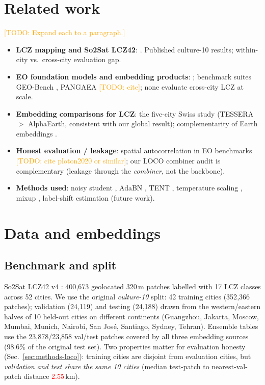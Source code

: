 \documentclass[11pt]{article}
\newif\ifverified
\newcommand{\uv}[1]{\ifverified#1\else\textcolor{red}{#1}\fi}
\newcommand{\todo}[1]{\textcolor{orange}{[TODO: #1]}}
\begin{document}
\section{Related work}\label{sec:related}

\todo{Expand each to a paragraph.}
\begin{itemize}
  \item \textbf{LCZ mapping and So2Sat LCZ42}: \citep{stewart2012lcz,
    zhu2020so2sat, qiu2020sen2lcz, demuzere2022lcz}. Published
    culture-10 results; within-city vs.\ cross-city evaluation gap.
  \item \textbf{EO foundation models and embedding products}:
    \citep{tessera2025, tesserav2_2026, alphaearth2025}; benchmark
    suites GEO-Bench \citep{lacoste2023geobench}, PANGAEA
    \todo{cite}; none evaluate cross-city LCZ at scale.
  \item \textbf{Embedding comparisons for LCZ}: the five-city Swiss
    study \citep{swiss_lcz2026} (TESSERA $>$ AlphaEarth, consistent
    with our global result); complementarity of Earth embeddings
    \citep{bettertogether2026}.
  \item \textbf{Honest evaluation / leakage}: spatial autocorrelation
    in EO benchmarks \todo{cite ploton2020 or similar}; our LOCO
    combiner audit is complementary (leakage through the
    \emph{combiner}, not the backbone).
  \item \textbf{Methods used}: noisy student \citep{xie2020noisy},
    AdaBN \citep{li2016adabn}, TENT \citep{wang2021tent}, temperature
    scaling \citep{guo2017calibration}, mixup \citep{zhang2018mixup},
    label-shift estimation \citep{lipton2018bbse} (future work).
\end{itemize}

\section{Data and embeddings}\label{sec:data}

\subsection{Benchmark and split}
So2Sat LCZ42 v4 \citep{zhu2020so2sat}: 400{,}673 geolocated
320\,m patches labelled with 17 LCZ classes across 52 cities. We use
the original \emph{culture-10} split: 42 training cities
(352{,}366 patches); validation (24{,}119) and testing
(24{,}188) drawn from the western/eastern halves of 10 held-out
cities on different continents (Guangzhou, Jakarta, Moscow, Mumbai,
Munich, Nairobi, San Jos\'e, Santiago, Sydney, Tehran). Ensemble
tables use the 23{,}878/23{,}858 val/test patches covered
by all three embedding sources (98.6\% of the original test
set). Two properties matter for evaluation honesty
(Sec.~\ref{sec:methods-loco}): training cities are disjoint from
evaluation cities, but \emph{validation and test share the same 10
cities} (median test-patch to nearest-val-patch distance
\uv{2.55}\,km).
\end{document}
